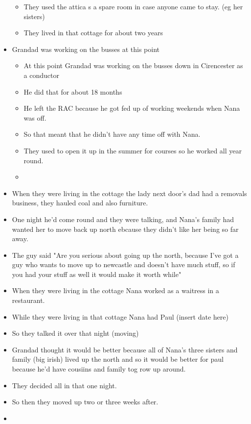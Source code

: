 \documentclass[10pt,twocolumn,letterpaper]{article}
\begin{document}
\begin{itemize}
\begin{itemize}
              \item They used the attica s a spare room in case anyone came to stay. (eg her sisters)
              \item They lived in that cottage for about two years
          \end{itemize}
    \item Grandad was working on the busses at this point
          \begin{itemize}
              \item At this point Grandad was working on the busses down in Cirencester as a conductor
              \item He did that for about 18 months
              \item He left the RAC because he got fed up of working weekends when Nana was off.
              \item So that meant that he didn't have any time off with Nana.
              \item They used to open it up in the summer for courses so he worked all year round.
              \item 
          \end{itemize}
    \item When they were living in the cottage the lady next door's dad had a removals business, they hauled coal and also furniture.
    \item One night he'd come round and they were talking, and Nana's family had wanted her to move back up north ebcause they didn't like her being so far away.
    \item The guy said "Are you serious about going up the north, because I've got a guy who wants to move up to newcastle and doesn't have much stuff, so if you had your stuff as well it would make it worth while"
    \item When they were living in the cottage Nana worked as a waitress in a restaurant.
    \item While they were living in that cottage Nana had Paul (insert date here)
    \item So they talked it over that night (moving)
    \item Grandad thought it would be better because all of Nana's three sisters and family (big irish) lived up the north and so it would be  better for paul because he'd have cousiins and family tog row up around.
    \item They decided all in that one night.
    \item So then they moved up two or three weeks after.
    \item 
    
    
\end{itemize}
\end{document}

